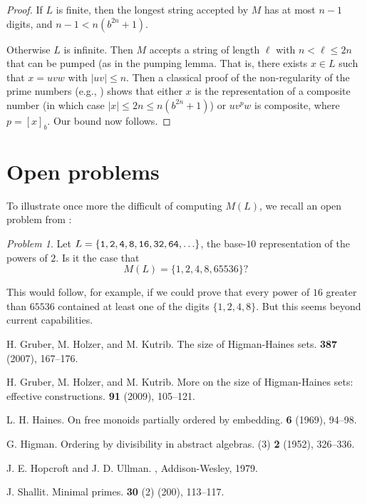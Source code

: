 \documentclass[12pt]{article}
\theoremstyle{plain}
\theoremstyle{definition}
\theoremstyle{remark}
\newtheorem{problem}[theorem]{Problem}
\newcommand{\0}{\mathtt{0}}
\newcommand{\1}{\mathtt{1}}
\newcommand{\2}{\mathtt{2}}
\newcommand{\3}{\mathtt{3}}
\newcommand{\4}{\mathtt{4}}
\newcommand{\5}{\mathtt{5}}
\newcommand{\6}{\mathtt{6}}
\newcommand{\7}{\mathtt{7}}
\newcommand{\8}{\mathtt{8}}
\newcommand{\9}{\mathtt{9}}
\begin{document}
\begin{proof}
If $L$ is finite, then the longest string accepted by $M$ has
at most $n-1$ digits, and $n-1 < n(b^{2n} + 1)$.

Otherwise $L$ is infinite.  Then $M$ accepts a string of length
$\ell$ with $n < \ell \leq 2n$ that can be pumped (as in the
pumping lemma.  That is, there exists $x \in L$ such that
$x = uvw$ with $|uv| \leq n$.  Then a classical proof of the
non-regularity of the prime numbers 
(e.g., \cite[Example 3.2, p.\ 57]{HU79})
shows that either $x$ is the representation of a composite 
number (in which case $|x| \leq 2n \leq n(b^{2n} + 1)$)
or $u v^p w$ is composite, where $p = [x]_b$.  
Our bound now follows.
\end{proof}

\section{Open problems}

To illustrate once more the difficult of computing $M(L)$, we recall
an open problem from \cite{Sh00}:

\begin{problem} 
Let $L = \lbrace {\tt 1, 2, 4, 8, 16, 32, 64, } \ldots \rbrace$, the
base-$10$ representation of the powers of $2$.  
Is it the case that
$$ M(L) = \lbrace 1, 2, 4, 8, 65536 \rbrace ? $$
\end{problem}

This would follow, for example, if we could prove that every power
of $16$ greater than $65536$ contained at least one of the digits
$\lbrace 1,2,4, 8 \rbrace$.  But this seems beyond current capabilities.



\begin{thebibliography}{9}

  H. Gruber, M. Holzer, and M. Kutrib.
\newblock The size of Higman-Haines sets.
 {\bf 387} (2007), 167--176.

  H. Gruber, M. Holzer, and M. Kutrib.
\newblock More on the size of Higman-Haines sets:  effective constructions.
 {\bf 91} (2009), 105--121.

  L. H. Haines.
\newblock On free monoids partially ordered by embedding.
 {\bf 6} (1969), 94--98.

  G. Higman.
\newblock Ordering by divisibility in abstract algebras.
 (3) {\bf 2} (1952), 326--336.

  J. E. Hopcroft and J. D. Ullman.
,
Addison-Wesley, 1979.

  J. Shallit.
\newblock Minimal primes.
 {\bf 30} (2) (200), 113--117.

\end{thebibliography}
\end{document}
